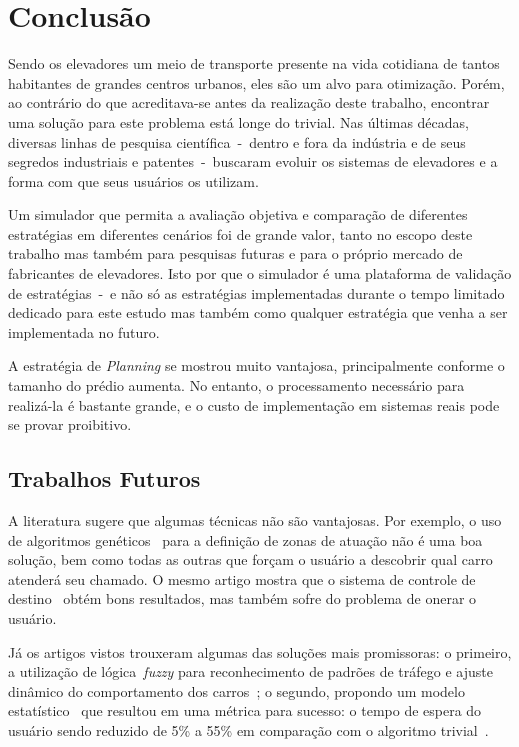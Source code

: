 \chapter{\label{chap:conclusion}Conclusão}

Sendo os elevadores um meio de transporte presente na vida cotidiana de tantos
habitantes de grandes centros urbanos, eles são um alvo para otimização. Porém,
ao contrário do que acreditava-se antes da realização deste trabalho, encontrar
uma solução para este problema está longe do trivial. Nas últimas décadas,
diversas linhas de pesquisa científica~-~dentro e fora da indústria e de seus
segredos industriais e patentes~-~buscaram evoluir os sistemas de elevadores e a
forma com que seus usuários os utilizam.

Um simulador que permita a avaliação objetiva e comparação de diferentes
estratégias em diferentes cenários foi de grande valor, tanto no escopo deste
trabalho mas também para pesquisas futuras e para o próprio mercado de
fabricantes de elevadores. Isto por que o simulador é uma plataforma de
validação de estratégias~-~e não só as estratégias implementadas durante o tempo
limitado dedicado para este estudo mas também como qualquer estratégia que venha
a ser implementada no futuro.

A estratégia de \textit{Planning} se mostrou muito vantajosa, principalmente
conforme o tamanho do prédio aumenta. No entanto, o processamento necessário
para realizá-la é bastante grande, e o custo de implementação em sistemas reais
pode se provar proibitivo.

\section{Trabalhos Futuros}

A literatura sugere que algumas técnicas não são vantajosas. Por exemplo, o uso
de algoritmos genéticos~\cite{KOEHLEROTTIGER02} para a definição de zonas de
atuação não é uma boa solução, bem como todas as outras que forçam o usuário a
descobrir qual carro atenderá seu chamado. O mesmo artigo mostra que o sistema
de controle de destino~\cite{KOEHLEROTTIGER02} obtém bons resultados, mas também
sofre do problema de onerar o usuário.

Já os artigos vistos trouxeram algumas das soluções mais promissoras: o
primeiro, a utilização de lógica~\textit{fuzzy} para reconhecimento de padrões
de tráfego e ajuste dinâmico do comportamento dos carros~\cite{marja97}; o
segundo, propondo um modelo estatístico~\cite{DBLP:journals/corr/abs-1212-2499}
que resultou em uma métrica para sucesso: o tempo de espera do usuário sendo
reduzido de 5\% a 55\% em comparação com o algoritmo
trivial~\cite{DBLP:journals/corr/abs-1212-2499}.

